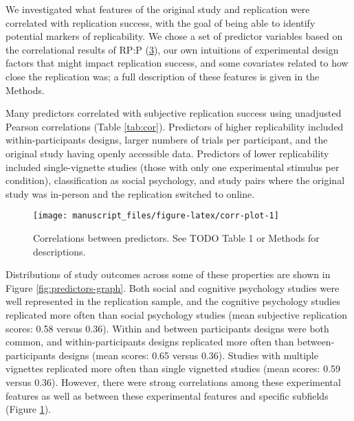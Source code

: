 \documentclass[
  english,
  a4paper,
]{article}
\begin{document}
We investigated what features of the original study and replication were correlated with replication success, with the goal of being able to identify potential markers of replicability. We chose a set of predictor variables based on the correlational results of RP:P (\protect\hyperlink{ref-openscienceconsortium2015}{3}), our own intuitions of experimental design factors that might impact replication success, and some covariates related to how close the replication was; a full description of these features is given in the Methods.

Many predictors correlated with subjective replication success using unadjusted Pearson correlations (Table \ref{tab:cor}). Predictors of higher replicability included within-participants designs, larger numbers of trials per participant, and the original study having openly accessible data. Predictors of lower replicability included single-vignette studies (those with only one experimental stimulus per condition), classification as social psychology, and study pairs where the original study was in-person and the replication switched to online.

\begin{figure}[ht]
\texttt{[image: manuscript\_files/figure-latex/corr-plot-1]} \caption{Correlations between predictors. See TODO Table 1 or Methods for descriptions. }\label{fig:corr-plot}
\end{figure}

Distributions of study outcomes across some of these properties are shown in Figure \ref{fig:predictors-graph}. Both social and cognitive psychology studies were well represented in the replication sample, and the cognitive psychology studies replicated more often than social psychology studies (mean subjective replication scores: 0.58 versus 0.36). Within and between participants designs were both common, and within-participants designs replicated more often than between-participants designs (mean scores: 0.65 versus 0.36). Studies with multiple vignettes replicated more often than single vignetted studies (mean scores: 0.59 versus 0.36). However, there were strong correlations among these experimental features as well as between these experimental features and specific subfields (Figure \ref{fig:corr-plot}).
\end{document}
